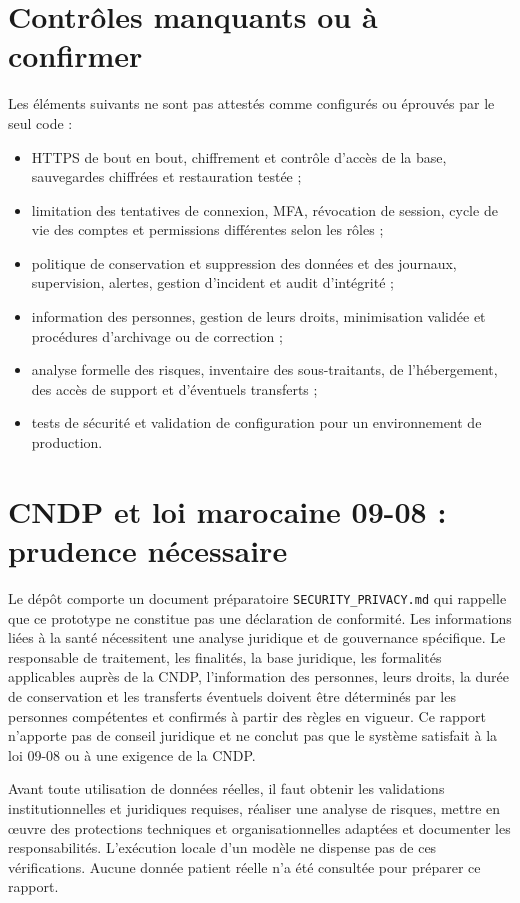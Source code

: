 \documentclass[11pt,a4paper]{report}
\newcommand{\code}[1]{\texttt{#1}}
\begin{document}
\section{Contrôles manquants ou à confirmer}
Les éléments suivants ne sont pas attestés comme configurés ou éprouvés par
le seul code :
\begin{itemize}
  \item HTTPS de bout en bout, chiffrement et contrôle d'accès de la base,
        sauvegardes chiffrées et restauration testée ;
  \item limitation des tentatives de connexion, MFA, révocation de session,
        cycle de vie des comptes et permissions différentes selon les rôles ;
  \item politique de conservation et suppression des données et des journaux,
        supervision, alertes, gestion d'incident et audit d'intégrité ;
  \item information des personnes, gestion de leurs droits, minimisation
        validée et procédures d'archivage ou de correction ;
  \item analyse formelle des risques, inventaire des sous-traitants, de
        l'hébergement, des accès de support et d'éventuels transferts ;
  \item tests de sécurité et validation de configuration pour un environnement
        de production.
\end{itemize}

\section{CNDP et loi marocaine 09-08 : prudence nécessaire}
Le dépôt comporte un document préparatoire \code{SECURITY\_PRIVACY.md} qui
rappelle que ce prototype ne constitue pas une déclaration de conformité.
Les informations liées à la santé nécessitent une analyse juridique et de
gouvernance spécifique. Le responsable de traitement, les finalités, la base
juridique, les formalités applicables auprès de la CNDP, l'information des
personnes, leurs droits, la durée de conservation et les transferts éventuels
doivent être déterminés par les personnes compétentes et confirmés à partir
des règles en vigueur. Ce rapport n'apporte pas de conseil juridique et ne
conclut pas que le système satisfait à la loi 09-08 ou à une exigence de la
CNDP.

Avant toute utilisation de données réelles, il faut obtenir les validations
institutionnelles et juridiques requises, réaliser une analyse de risques,
mettre en œuvre des protections techniques et organisationnelles adaptées
et documenter les responsabilités. L'exécution locale d'un modèle ne
dispense pas de ces vérifications. Aucune donnée patient réelle n'a été
consultée pour préparer ce rapport.
\end{document}
